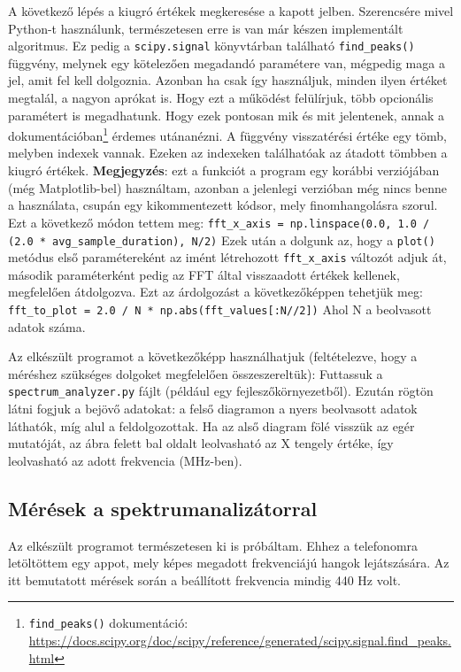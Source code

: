 \documentclass[12pt,a4paper]{article}
\begin{document}
      A következő lépés a kiugró értékek megkeresése a kapott jelben. Szerencsére mivel Python-t használunk, természetesen erre is van már készen implementált algoritmus. Ez pedig a \texttt{scipy.signal} könyvtárban található \texttt{find\_peaks()} függvény, melynek egy kötelezően megadandó paramétere van, mégpedig maga a jel, amit fel kell dolgoznia. Azonban ha csak így használjuk, minden ilyen értéket megtalál, a nagyon aprókat is. Hogy ezt a működést felülírjuk, több opcionális paramétert is megadhatunk. Hogy ezek pontosan mik és mit jelentenek, annak a dokumentációban\footnote{\texttt{find\_peaks()} dokumentáció: \url{https://docs.scipy.org/doc/scipy/reference/generated/scipy.signal.find\_peaks.html}} érdemes utánanézni. A függvény visszatérési értéke egy tömb, melyben indexek vannak. Ezeken az indexeken találhatóak az átadott tömbben a kiugró értékek. \textbf{Megjegyzés}: ezt a funkciót a program egy korábbi verziójában (még Matplotlib-bel) használtam, azonban a jelenlegi verzióban még nincs benne a használata, csupán egy kikommentezett kódsor, mely finomhangolásra szorul. Ezt a következő módon tettem meg:
        \texttt{fft\_x\_axis = np.linspace(0.0, 1.0 / (2.0 * avg\_sample\_duration), N/2)}
      Ezek után a dolgunk az, hogy a \texttt{plot()} metódus első paramétereként az imént létrehozott \texttt{fft\_x\_axis} változót adjuk át, második paraméterként pedig az FFT által visszaadott értékek kellenek, megfelelően átdolgozva. Ezt az árdolgozást a következőképpen tehetjük meg: \texttt{fft\_to\_plot = 2.0 / N * np.abs(fft\_values[:N//2])}
      Ahol N a beolvasott adatok száma.

      Az elkészült programot a következőképp használhatjuk (feltételezve, hogy a méréshez szükséges dolgoket megfelelően összeszereltük): Futtassuk a \texttt{spectrum\_analyzer.py} fájlt (például egy fejleszőkörnyezetből). Ezután rögtön látni fogjuk a bejövő adatokat: a felső diagramon a nyers beolvasott adatok láthatók, míg alul a feldolgozottak. Ha az alső diagram fölé visszük az egér mutatóját, az ábra felett bal oldalt leolvasható az X tengely értéke, így leolvasható az adott frekvencia (MHz-ben).

    \subsection{Mérések a spektrumanalizátorral}
      Az elkészült programot természetesen ki is próbáltam. Ehhez a telefonomra letöltöttem egy appot, mely képes megadott frekvenciájú hangok lejátszására. Az itt bemutatott mérések során a beállított frekvencia mindig 440 Hz volt.
\end{document}
